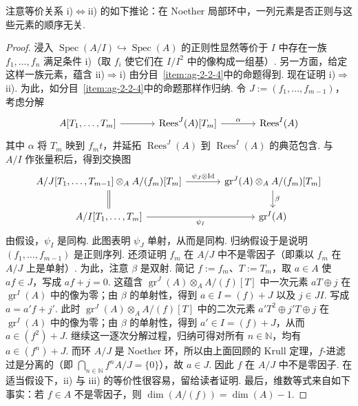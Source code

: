 注意等价关系 i)$\Leftrightarrow$ii) 的如下推论：在 Noether 局部环中，一列元素是否正则与这些元素的顺序无关.
\begin{proof}
浸入 $\operatorname{Spec}(A/I)\hookrightarrow\operatorname{Spec}(A)$ 的正则性显然等价于 $I$ 中存在一族 $f_1,\ldots,f_n$ 满足条件 i)（取 $f_i$ 使它们在 $I/I^2$ 中的像构成一组基）.
另一方面，给定这样一族元素，蕴含 ii)$\Rightarrow$i) 由分目~\ref{item:ag-2-2-4}中的命题得到.
现在证明 i)$\Rightarrow$ii). 为此，如分目~\ref{item:ag-2-2-4}中的命题那样作归纳. 令 $J:=(f_1,\ldots,f_{m-1})$，考虑分解
\begin{align*}
\begin{tikzcd}[ampersand replacement=\&,column sep=large]
A[T_1,\ldots,T_m]\arrow[r] \& \operatorname{Rees}^{J}(A)[T_m]\arrow[r,"\alpha"] \& \operatorname{Rees}^{I}(A)
\end{tikzcd}
\end{align*}
其中 $\alpha$ 将 $T_m$ 映到 $f_mt$，并延拓 $\operatorname{Rees}^{J}(A)$ 到 $\operatorname{Rees}^{I}(A)$ 的典范包含. 与 $A/I$ 作张量积后，得到交换图
\begin{align*}
\begin{tikzcd}[ampersand replacement=\&,column sep=large]
A/J[T_1,\ldots,T_{m-1}]\otimes_A A/(f_m)[T_m]\arrow[r,"\psi_J\otimes\operatorname{Id}"]\arrow[d,equal] \& \operatorname{gr}^{J}(A)\otimes_A A/(f_m)[T_m]\arrow[d,"\beta"]\\
A/I[T_1,\ldots,T_m]\arrow[r,"\psi_I"'] \& \operatorname{gr}^{I}(A)
\end{tikzcd}
\end{align*}
由假设，$\psi_I$ 是同构. 此图表明 $\psi_J$ 单射，从而是同构. 归纳假设于是说明 $(f_1,\ldots,f_{m-1})$ 是正则序列. 还须证明 $f_m$ 在 $A/J$ 中不是零因子（即乘以 $f_m$ 在 $A/J$ 上是单射）. 为此，注意 $\beta$ 是双射. 简记 $f:=f_m$、$T:=T_m$，取 $a\in A$ 使 $af\in J$，写成 $af+j=0$. 这蕴含 $\operatorname{gr}^{J}(A)\otimes_AA/(f)[T]$ 中一次元素 $aT\oplus j$ 在 $\operatorname{gr}^{I}(A)$ 中的像为零；由 $\beta$ 的单射性，得到 $a\in I=(f)+J$ 以及 $j\in JI$. 写成 $a=a'f+j'$. 此时 $\operatorname{gr}^{J}(A)\otimes_AA/(f)[T]$ 中的二次元素 $a'T^2\oplus j'T\oplus j$ 在 $\operatorname{gr}^{I}(A)$ 中的像为零；由 $\beta$ 的单射性，得到 $a'\in I=(f)+J$，从而 $a\in(f^2)+J$. 继续这一逐次分解过程，归纳可得对所有 $n\in\mathbb N$，均有 $a\in(f^n)+J$. 而环 $A/J$ 是 Noether 环，所以由上面回顾的 Krull 定理，$f$-进滤过是分离的（即 $\bigcap_{n\in\mathbb N}f^nA/J=\{0\}$），故 $a\in J$. 因此 $f$ 在 $A/J$ 中不是零因子.
在适当假设下，ii) 与 iii) 的等价性很容易，留给读者证明.
最后，维数等式来自如下事实：若 $f\in A$ 不是零因子，则 $\dim(A/(f))=\dim(A)-1$.
\end{proof}
